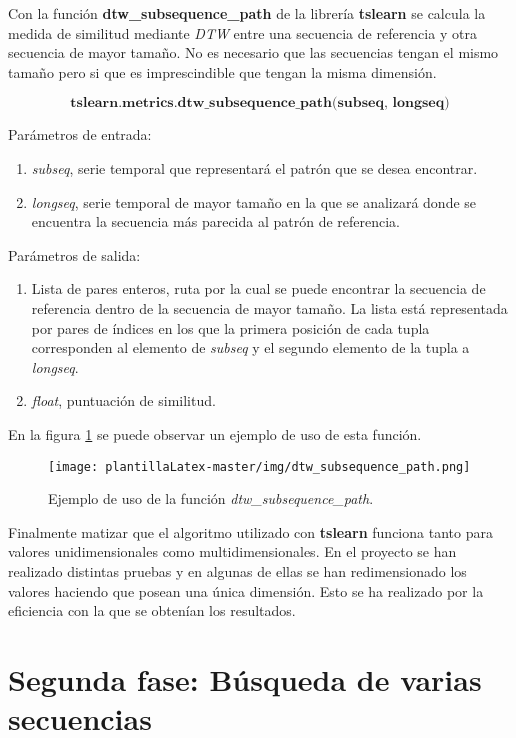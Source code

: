 Con la función \textbf{dtw\_subsequence\_path} de la librería \textbf{tslearn} se calcula la medida de similitud mediante \textit{DTW} entre una secuencia de referencia y otra secuencia de mayor tamaño. No es necesario que las secuencias tengan el mismo tamaño pero si que es imprescindible que tengan la misma dimensión.

\[\textbf{tslearn.metrics.dtw\_subsequence\_path(subseq, longseq)}\]

Parámetros de entrada:
\begin{enumerate}
    \item \emph{subseq}, serie temporal que representará el patrón que se desea encontrar.
    \item \emph{longseq}, serie temporal de mayor tamaño en la que se analizará donde se encuentra la secuencia más parecida al patrón de referencia.
\end{enumerate}

Parámetros de salida:
\begin{enumerate}
    \item Lista de pares enteros, ruta por la cual se puede encontrar la secuencia de referencia dentro de la secuencia de mayor tamaño. La lista está representada por pares de índices en los que la primera posición de cada tupla corresponden al elemento de \textit{subseq} y el segundo elemento de la tupla a \textit{longseq}.
    \item \textit{float}, puntuación de similitud.
\end{enumerate}

En la figura \ref{fig:dtw_subsequence_path} se puede observar un ejemplo de uso de esta función. 
\begin{figure}[H]
    \centering
    \texttt{[image: plantillaLatex-master/img/dtw\_subsequence\_path.png]}
    \caption{ Ejemplo de uso de la función \textit{dtw\_subsequence\_path}.}
    \label{fig:dtw_subsequence_path}
\end{figure}

Finalmente matizar que el algoritmo utilizado con \textbf{tslearn} funciona tanto para valores unidimensionales como multidimensionales. En el proyecto se han realizado distintas pruebas y en algunas de ellas se han redimensionado los valores haciendo que posean una única dimensión. Esto se ha realizado por la eficiencia con la que se obtenían los resultados.


\section{Segunda fase: Búsqueda de varias secuencias} \label{cap:segundaF}

